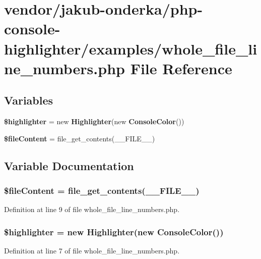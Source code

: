 \section{vendor/jakub-\/onderka/php-\/console-\/highlighter/examples/whole\+\_\+file\+\_\+line\+\_\+numbers.php File Reference}
\label{whole__file__line__numbers_8php}
\subsection*{Variables}
\begin{DoxyCompactItemize}
\item 
{\bf \$highlighter} = new {\bf Highlighter}(new {\bf Console\+Color}())
\item 
{\bf \$file\+Content} = file\+\_\+get\+\_\+contents(\+\_\+\+\_\+\+F\+I\+L\+E\+\_\+\+\_\+)
\end{DoxyCompactItemize}


\subsection{Variable Documentation}
\subsubsection[{\$file\+Content}]{\setlength{\rightskip}{0pt plus 5cm}\$file\+Content = file\+\_\+get\+\_\+contents(\+\_\+\+\_\+\+F\+I\+L\+E\+\_\+\+\_\+)}\label{whole__file__line__numbers_8php_ad89080bb6e501b4f254f01ee5d24fa2d}


Definition at line 9 of file whole\+\_\+file\+\_\+line\+\_\+numbers.\+php.

\subsubsection[{\$highlighter}]{\setlength{\rightskip}{0pt plus 5cm}\$highlighter = new {\bf Highlighter}(new {\bf Console\+Color}())}\label{whole__file__line__numbers_8php_a19caa67352dbd1540a123648430ea09b}


Definition at line 7 of file whole\+\_\+file\+\_\+line\+\_\+numbers.\+php.

